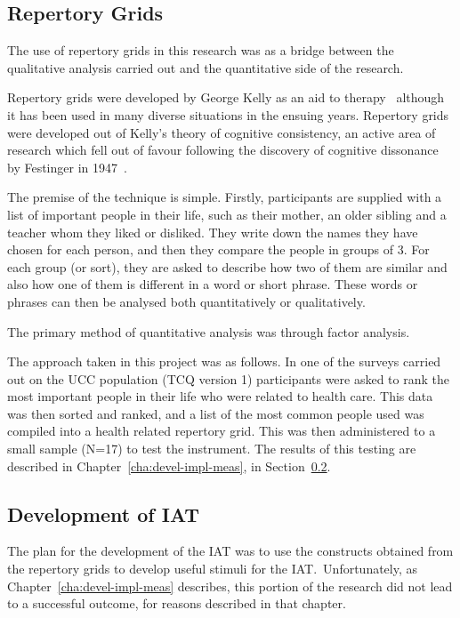 \subsection{Repertory Grids}

The use of repertory grids in this research was as a bridge between the qualitative analysis carried out and the quantitative side of the research. 

Repertory grids were developed by George Kelly as an aid to therapy~\cite{kelly2003psychology} although it has been used in many diverse situations in the ensuing years. 
Repertory grids were developed out of Kelly's theory of cognitive consistency, an active area of research which fell out of favour following the discovery of cognitive dissonance by Festinger in 1947~\cite{greenwald2002}.

The premise of the technique is simple. Firstly, participants are supplied with a list of important people in their life, such as their mother, an older sibling and a teacher whom they liked or disliked. They write down the names they have chosen for each person, and then they compare the people in groups of 3. For each group (or sort), they are asked to describe how two of them are similar and also how one of them is different in a word or short phrase. These words or phrases can then be analysed both quantitatively or qualitatively.

The primary method of quantitative analysis was through factor analysis.

The approach taken in this project was as follows. In one of the surveys carried out on the UCC population (TCQ version 1) participants were asked to rank the most important people in their life who were related to health care. 
This data was then sorted and ranked, and a list of the most common people used was compiled into a health related repertory grid. 
This was then administered to a small sample (N=17) to test the instrument. 
 The results of this testing are described in Chapter~\ref{cha:devel-impl-meas}, in Section~\ref{sec:development-iat}.

\subsection{Development of IAT}
\label{sec:development-iat}

The plan for the development of the IAT was to use the constructs obtained from the repertory grids to develop useful stimuli for the IAT.\
Unfortunately, as Chapter~\ref{cha:devel-impl-meas} describes, this portion of the research did not lead to a successful outcome, for reasons described in that chapter.

